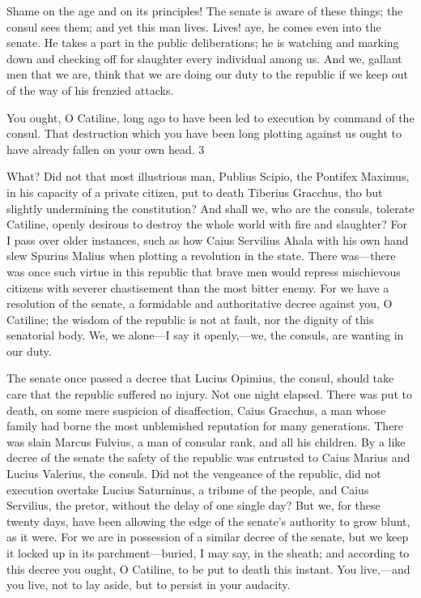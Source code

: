 \documentclass[a4paper]{amsbook}
\begin{document}
Shame on the age and on its principles! The senate is aware of these things; the consul sees them; and yet this man lives. Lives! aye, he comes even into the senate. He takes a part in the public deliberations; he is watching and marking down and checking off for slaughter every individual among us. And we, gallant men that we are, think that we are doing our duty to the republic if we keep out of the way of his frenzied attacks.

You ought, O Catiline, long ago to have been led to execution by command of the consul. That destruction which you have been long plotting against us ought to have already fallen on your own head.	 3

What? Did not that most illustrious man, Publius Scipio, the Pontifex Maximus, in his capacity of a private citizen, put to death Tiberius Gracchus, tho but slightly undermining the constitution? And shall we, who are the consuls, tolerate Catiline, openly desirous to destroy the whole world with fire and slaughter? For I pass over older instances, such as how Caius Servilius Ahala with his own hand slew Spurius Malius when plotting a revolution in the state. There was—there was once such virtue in this republic that brave men would repress mischievous citizens with severer chastisement than the most bitter enemy. For we have a resolution of the senate, a formidable and authoritative decree against you, O Catiline; the wisdom of the republic is not at fault, nor the dignity of this senatorial body. We, we alone—I say it openly,—we, the consuls, are wanting in our duty.

The senate once passed a decree that Lucius Opimius, the consul, should take care that the republic suffered no injury. Not one night elapsed. There was put to death, on some mere suspicion of disaffection, Caius Gracchus, a man whose family had borne the most unblemished reputation for many generations. There was slain Marcus Fulvius, a man of consular rank, and all his children. By a like decree of the senate the safety of the republic was entrusted to Caius Marius and Lucius Valerius, the consuls. Did not the vengeance of the republic, did not execution overtake Lucius Saturninus, a tribune of the people, and Caius Servilius, the pretor, without the delay of one single day? But we, for these twenty days, have been allowing the edge of the senate's authority to grow blunt, as it were. For we are in possession of a similar decree of the senate, but we keep it locked up in its parchment—buried, I may say, in the sheath; and according to this decree you ought, O Catiline, to be put to death this instant. You live,—and you live, not to lay aside, but to persist in your audacity.
\end{document}
